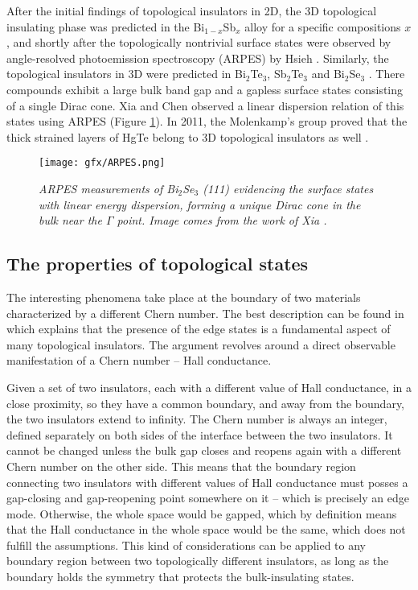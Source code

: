 \documentclass[titlepage,a4paper]{book}
\newcommand{\wciecie}{\quad\phantom{v}}
\begin{document}
After the initial findings of topological insulators in 2D, the 3D topological insulating phase was predicted in the Bi$_{1-x}$Sb$_x$ alloy for a specific compositions $x$ \cite{Fu_Topology}, and shortly after the topologically nontrivial surface states were observed by angle-resolved photoemission spectroscopy (ARPES) by Hsieh \cite{Hsieh}. Similarly, the topological insulators in 3D were predicted in Bi$_2$Te$_3$, Sb$_2$Te$_3$ \cite{Zhang_Topology} and Bi$_2$Se$_3$ \cite{Zhang_Topology}\cite{Xia_Topology}. There compounds exhibit a large bulk band gap and a gapless surface states consisting of a single Dirac cone. Xia \cite{Xia_Topology} and Chen \cite{Chen_Topology} observed a linear dispersion relation of this states using ARPES (Figure \ref{fig:ARPES}). In 2011, the Molenkamp's group proved that the thick strained layers of HgTe belong to 3D topological insulators as well \cite{Brune_State2}.

\begin{figure}[H]
	\centering
	\texttt{[image: gfx/ARPES.png]}
	\vspace{-10pt}
	\caption{\textit{ARPES measurements of Bi$_2$Se$_3$ (111) evidencing the surface states with linear energy dispersion, forming a unique Dirac cone in the bulk near the $\Gamma$ point. Image comes from the work of Xia \cite{Xia_Topology}.}}
	\label{fig:ARPES}
\end{figure}

\subsection{The properties of topological states}
\wciecie
The interesting phenomena take place at the boundary of two materials characterized by a different Chern number. The best description can be found in \cite{Bernevig_book} which explains that the presence of the edge states is a fundamental aspect of many topological insulators. The argument revolves around a direct observable manifestation of a Chern number -- Hall conductance.

Given a set of two insulators, each with a different value of Hall conductance, in a close proximity, so they have a common boundary, and away from the boundary, the two insulators extend to infinity. The Chern number is always an integer, defined separately on both sides of the interface between the two insulators. It cannot be changed unless the bulk gap closes and reopens again with a different Chern number on the other side. This means that the boundary region connecting two insulators with different values of Hall conductance must posses a gap-closing and gap-reopening point somewhere on it -- which is precisely an edge mode. Otherwise, the whole space would be gapped, which by definition means that the Hall conductance in the whole space would be the same, which does not fulfill the assumptions. This kind of considerations can be applied to any boundary region between two topologically different insulators, as long as the boundary holds the symmetry that protects the bulk-insulating states. 
\end{document}
